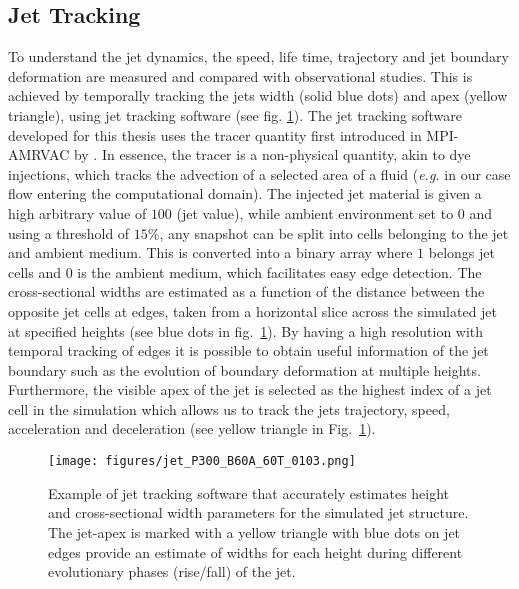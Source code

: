 \documentclass[12pt]{ociamthesis}
\newcommand{\fref}[1]{fig. \ref{#1}}
\begin{document}
\subsection{Jet Tracking}
\label{subsec:jet_tracking}
To understand the jet dynamics, the speed, life time, trajectory and jet boundary deformation are measured and compared with observational studies. This is achieved by temporally tracking the jets width (solid blue dots) and apex (yellow triangle), using jet tracking software (see \fref{jet_tracker}). The jet tracking software developed for this thesis uses the tracer quantity first introduced in MPI-AMRVAC by \cite{Porth_2014}. In essence, the tracer is a non-physical quantity, akin to dye injections, which tracks the advection of a selected area of a fluid (\textit{e.g.} in our case flow entering the computational domain). The injected jet material is given a high arbitrary value of $100$ (jet value), while ambient environment set to 0 and using a threshold of $15\%$, any snapshot can be split into cells belonging to the jet and ambient medium. This is converted into a binary array where $1$ belongs jet cells and $0$ is the ambient medium, which facilitates easy edge detection. The cross-sectional widths are estimated as a function of the distance between the opposite jet cells at edges, taken from a horizontal slice across the simulated jet at specified heights (see blue dots in fig.~\ref{jet_tracker}). By having a high resolution with temporal tracking of edges it is possible to obtain useful information of the jet boundary such as the evolution of boundary deformation at multiple heights. Furthermore, the visible apex of the jet is selected as the highest index of a jet cell in the simulation which allows us to track the jets trajectory, speed, acceleration and deceleration (see yellow triangle in Fig.~\ref{jet_tracker}).
\begin{figure}
\centering
{\texttt{[image: figures/jet\_P300\_B60A\_60T\_0103.png]}} 
\caption{Example of jet tracking software that accurately estimates height and cross-sectional width parameters for the simulated jet structure. The jet-apex is marked with a yellow triangle with blue dots on jet edges provide an estimate of widths for each height during different evolutionary phases (rise/fall) of the jet.}
\label{jet_tracker}
\end{figure}
\end{document}
